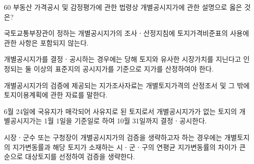 \begin{question}{60}
부동산 가격공시 및 감정평가에 관한 법령상 개별공시지가에 관한 설명으로 옳은 것은?
\begin{choices}
  \item 국토교통부장관이 정하는 개별공시지가의 조사ㆍ산정지침에 토지가격비준표의 사용에 관한 사항은 포함되지 않는다.
  \item 개별공시지가를 결정ㆍ공시하는 경우에는 당해 토지와 유사한 시장가치를 지닌다고 인정되는 둘 이상의 표준지의 공시지가를 기준으로 지가를 산정하여야 한다.
  \item 개별공시지가의 검증에 제공되는 지가조사자료는 개별토지가격의 산정조서 및 그 밖에 토지이용계획에 관한 자료를 말한다.
  \item 6월 24일에 국유지가 매각되어 사유지로 된 토지로서 개별공시지가가 없는 토지의 개별공시지가는 1월 1일을 기준일로 하여 10월 31일까지 결정ㆍ공시한다.
  \item 시장ㆍ군수 또는 구청장이 개별공시지가의 검증을 생략하고자 하는 경우에는 개별토지의 지가변동률과 해당 토지가 소재하는 시ㆍ군ㆍ구의 연평균 지가변동률의 차이가 큰 순으로 대상토지를 선정하여 검증을 생략한다.
\end{choices}
\end{question}
